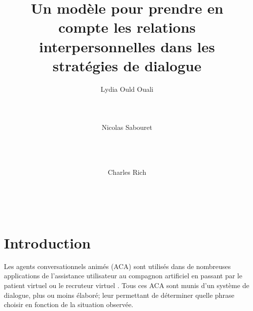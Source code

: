 \documentclass [french]{sig-alternate-05-2015}
\begin{document}
\title{Un modèle pour prendre en compte les relations interpersonnelles dans les stratégies de dialogue}



\author{
\alignauthor Lydia Ould Ouali\\
       \\
       \\
       \\
\alignauthor Nicolas Sabouret\\
       \\
       \\
       \\
        \and
\alignauthor Charles Rich\\
       \\
       \\
       \\
}


\maketitle
\begin{abstract}

\end{abstract}



\section{Introduction}


Les agents conversationnels animés (ACA) sont utilisés dans de nombreuses applications de l'assistance utilisateur \cite{ref} au compagnon artificiel \cite{sidner2013always, riviere2014aca} en passant par le patient virtuel \cite{annesysteme} ou le recruteur virtuel \cite{jones2012affective}. Tous ces ACA sont munis d'un système de dialogue, plus ou moins élaboré; leur permettant de déterminer quelle phrase choisir en fonction de la situation observée.
\end{document}
